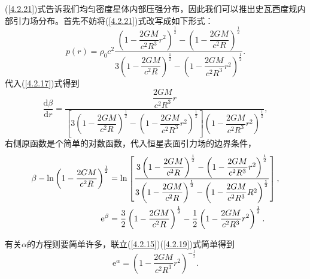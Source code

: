 \documentclass[11pt, a4paper, oneside, onecolumn]{ctexart}
\numberwithin{equation}{subsection}
\begin{document}
(\ref{4.2.21})式告诉我们均匀密度星体内部压强分布，因此我们可以推出史瓦西度规内部引力场分布。首先不妨将(\ref{4.2.21})式改写成如下形式：
\begin{equation}
p\left(r\right)=\rho_{0}c^{2}\frac{\left(1-\dfrac{2GM}{c^{2}R^{3}}r^{2}\right)^{\frac{1}{2}}-\left(1-\dfrac{2GM}{c^{2}R}\right)^{\frac12}}{3\left(1-\dfrac{2GM}{c^{2}R}\right)^{\frac12}-\left(1-\dfrac{2GM}{c^{2}R^{3}}r^{2}\right)^{\frac{1}{2}}}.
\end{equation}
代入(\ref{4.2.17})式得到
\begin{equation}
\frac{\mathrm{d}\beta}{\mathrm{d}r}=\frac{\dfrac{2GM}{c^{2}R^{3}}r}{\left[3\left(1-\dfrac{2GM}{c^{2}R}\right)^{\frac12}-\left(1-\dfrac{2GM}{c^{2}R^{3}}r^{2}\right)^{\frac{1}{2}}\right]\left(1-\dfrac{2GM}{c^{2}R^{3}}r^{2}\right)^{\frac{1}{2}}},
\end{equation}
右侧原函数是个简单的对数函数，代入恒星表面引力场的边界条件，
\begin{align}
\beta-\ln\left(1-\frac{2GM}{c^{2}R}\right)^{\frac{1}{2}}&=\ln\left[\dfrac{3\left(1-\dfrac{2GM}{c^{2}R}\right)^{\frac12}-\left(1-\dfrac{2GM}{c^{2}R^{3}}r^{2}\right)^{\frac{1}{2}}}{3\left(1-\dfrac{2GM}{c^{2}R}\right)^{\frac12}-\left(1-\dfrac{2GM}{c^{2}R^{3}}R^{2}\right)^{\frac{1}{2}}}\right],\notag\\
\mathrm{e}^{\beta}&=\frac{3}{2}\left(1-\dfrac{2GM}{c^{2}R}\right)^{\frac12}-\frac{1}{2}\left(1-\dfrac{2GM}{c^{2}R^{3}}r^{2}\right)^{\frac{1}{2}}.
\end{align}

有关$\alpha$的方程则要简单许多，联立(\ref{4.2.15})(\ref{4.2.19})式简单得到
\begin{equation}
\mathrm{e}^{\alpha}=\left(1-\frac{2GM}{c^{2}R^{3}}r^{2}\right)^{-\frac{1}{2}}.
\end{equation}
\end{document}
